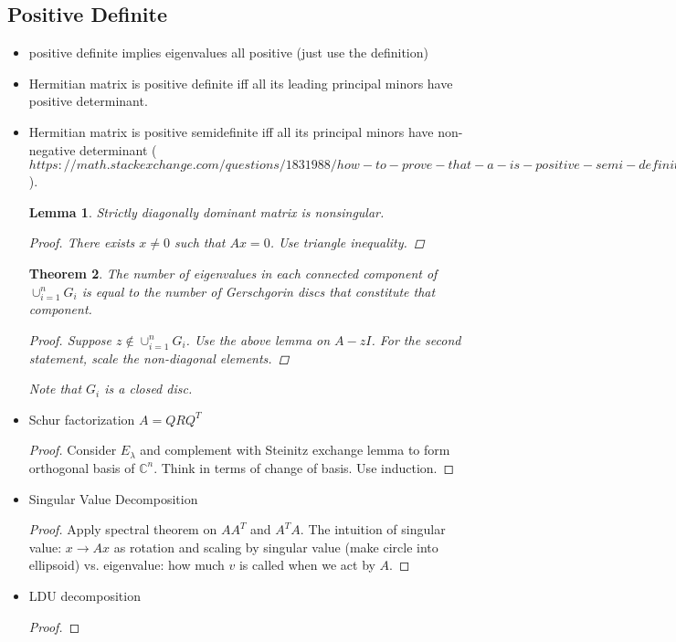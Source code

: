 \documentclass{article}
\newtheorem{theorem}{Theorem}
\newtheorem{lemma}[theorem]{Lemma}
\theoremstyle{remark}
\begin{document}
\subsection*{Positive Definite}
\begin{itemize}
\item positive definite implies eigenvalues all positive (just use the definition)
    \item Hermitian matrix is positive definite iff all its leading principal minors have positive determinant.
    \item Hermitian matrix is positive semidefinite iff all its principal minors have non-negative determinant ($https://math.stackexchange.com/questions/1831988/how-to-prove-that-a-is-positive-semi-definite-if-all-principal-minors-are-non$).
\begin{lemma}
Strictly diagonally dominant matrix is nonsingular.
\begin{proof}
There exists $x\neq 0$ such that $Ax=0$. Use triangle inequality.
\end{proof}
\end{lemma}
\begin{theorem}
The number of eigenvalues in each connected component of $\cup_{i=1}^n G_i$ is equal to the number of Gerschgorin discs that constitute that component.
\begin{proof}
Suppose $z\not\in \cup^n_{i=1}G_i$. Use the above lemma on $A-zI$. For the second statement, scale the non-diagonal elements.
\end{proof}
Note that $G_i$ is a closed disc.
\end{theorem}

\item Schur factorization
$A=QRQ^T$
\begin{proof}
Consider $E_\lambda$ and complement with Steinitz exchange lemma to form orthogonal basis of $\mathbb{C}^n$. Think in terms of change of basis. Use induction.
\end{proof}
\item Singular Value Decomposition
\begin{proof}
Apply spectral theorem on $AA^T$ and $A^TA$. The intuition of singular value: $x\to Ax$ as rotation and scaling by singular value (make circle into ellipsoid) vs. eigenvalue: how much $v$ is called when we act by $A$.
\end{proof}
\item LDU decomposition
\begin{proof}


\end{proof}
\end{itemize}
\end{document}
